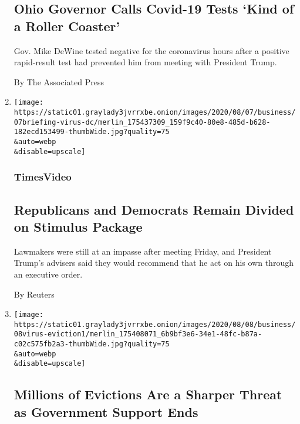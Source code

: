 \begin{enumerate}
  \hypertarget{ohio-governor-calls-covid-19-tests-kind-of-a-roller-coaster}{%
  \subsection{Ohio Governor Calls Covid-19 Tests `Kind of a Roller
  Coaster'}\label{ohio-governor-calls-covid-19-tests-kind-of-a-roller-coaster}}

  Gov. Mike DeWine tested negative for the coronavirus hours after a
  positive rapid-result test had prevented him from meeting with
  President Trump.

  By The Associated Press
\item
  \href{/video/us/100000007279221/republicans-democrats-divided-over-stimulus.html}{}

  \texttt{[image: https://static01.graylady3jvrrxbe.onion/images/2020/08/07/business/07briefing-virus-dc/merlin\_175437309\_159f9c40-80e8-485d-b628-182ecd153499-thumbWide.jpg?quality=75\\\&auto=webp\\\&disable=upscale]}

  \hypertarget{timesvideo-1}{%
  \subsubsection{TimesVideo}\label{timesvideo-1}}

  \hypertarget{republicans-and-democrats-remain-divided-on-stimulus-package}{%
  \subsection{Republicans and Democrats Remain Divided on Stimulus
  Package}\label{republicans-and-democrats-remain-divided-on-stimulus-package}}

  Lawmakers were still at an impasse after meeting Friday, and President
  Trump's advisers said they would recommend that he act on his own
  through an executive order.

  By Reuters
\item
  \href{/2020/08/07/business/economy/housing-economy-eviction-renters.html}{}

  \texttt{[image: https://static01.graylady3jvrrxbe.onion/images/2020/08/08/business/08virus-eviction1/merlin\_175408071\_6b9bf3e6-34e1-48fc-b87a-c02c575fb2a3-thumbWide.jpg?quality=75\\\&auto=webp\\\&disable=upscale]}

  \hypertarget{millions-of-evictions-are-a-sharper-threat-as-government-support-ends}{%
  \subsection{Millions of Evictions Are a Sharper Threat as Government
  Support
  Ends}\label{millions-of-evictions-are-a-sharper-threat-as-government-support-ends}}


\end{enumerate}
